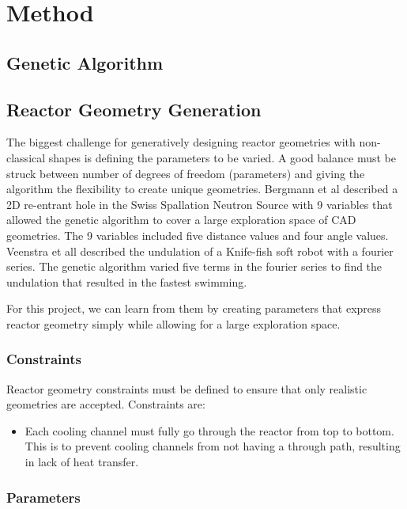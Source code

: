 \section{Method}

\subsection{Genetic Algorithm}

\subsection{Reactor Geometry Generation}
The biggest challenge for generatively designing reactor geometries with 
non-classical shapes is defining the parameters to be varied. 
A good balance must be struck between number of degrees of freedom (parameters) 
and giving the algorithm the flexibility to create unique geometries. 
Bergmann et al \cite{bergmann_simulation_2018} described a 2D re-entrant hole 
in the Swiss Spallation Neutron Source with 9 variables that allowed the genetic 
algorithm to cover a large exploration space of CAD geometries. 
The 9 variables included five distance values and four angle values. 
Veenstra et all \cite{veenstra_evolution_2018} described the undulation of 
a Knife-fish soft robot with a fourier series. 
The genetic algorithm varied five terms in the fourier series to find the undulation 
that resulted in the fastest swimming. 

For this project, we can learn from them by creating parameters that
express reactor geometry simply while allowing for a large exploration space. 

\subsubsection{Constraints}
Reactor geometry constraints must be defined to ensure that only realistic 
geometries are accepted. 
Constraints are: 
\begin{itemize}
    \item Each cooling channel must fully go through the reactor from top to 
    bottom. This is to prevent cooling channels from not having a through 
    path, resulting in lack of heat transfer. 
\end{itemize}

\subsubsection{Parameters}

